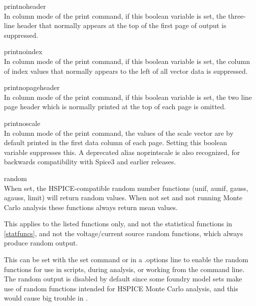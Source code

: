\begin{description}
\item{\et printnoheader}\\
In column mode of the {\cb print} command, if this boolean variable is
set, the three-line header that normally appears at the top of the
first page of output is suppressed.

\item{\et printnoindex}\\
In column mode of the {\cb print} command, if this boolean variable is
set, the column of index values that normally appears to the left of
all vector data is suppressed.

\item{\et printnopageheader}\\
In column mode of the {\cb print} command, if this boolean variable is
set, the two line page header which is normally printed at the top of
each page is omitted.

\item{\et printnoscale}\\
In column mode of the {\cb print} command, the values of the scale
vector are by default printed in the first data column of each page. 
Setting this boolean variable suppresses this.  A deprecated alias
{\et noprintscale} is also recognized, for backwards compatibility
with Spice3 and earlier {\WRspice} releases.

\item{\et random}\\
When set, the HSPICE-compatible random number functions ({\vt unif},
{\vt aunif}, {\vt gauss}, {\vt agauss}, {\vt limit}) will return
random values.  When not set and not running Monte Carlo analysis
these functions always return mean values.

This applies to the listed functions only, and not the statistical
functions in \ref{statfuncs}, and not the voltage/current source
random functions, which always produce random output.

This can be set with the {\cb set} command or in a {\vt .options} line
to enable the random functions for use in scripts, during analysis, or
working from the command line.  The random output is disabled by
default since some foundry model sets make use of random functions
intended for HSPICE Monte Carlo analysis, and this would cause big
trouble in {\WRspice}.


\end{description}
